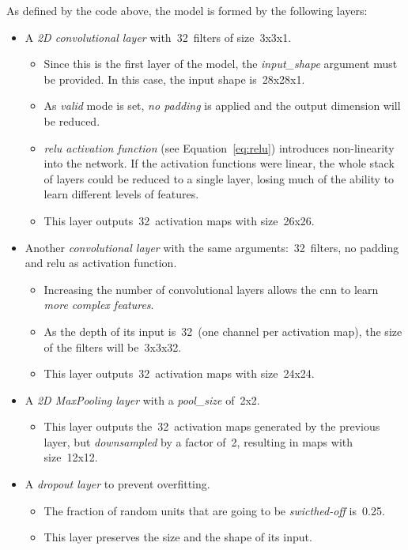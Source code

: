 As defined by the code above, the model is formed by the following layers:
\begin{itemize}
	\item A \emph{2D convolutional layer} with~32~filters of size~3x3x1.
	\begin{itemize}
		\item Since this is the first layer of the model, the \emph{\textit{input\_shape}} argument must be provided. In this case, the input shape is~28x28x1. 
		\item As \textit{valid} mode is set, \emph{no padding} is applied and the output dimension will be reduced. 
		\item \emph{\gls{relu} activation function} (see Equation~\ref{eq:relu}) introduces non-linearity into the network. If the activation functions were linear, the whole stack of layers could be reduced to a single layer, losing much of the ability to learn different levels of features.
		\item This layer outputs~32~activation maps with size~26x26.
	\end{itemize}
	
	\item Another \emph{convolutional layer} with the same arguments:~32~filters, no padding and \gls{relu} as activation function.
	\begin{itemize}
		\item Increasing the number of convolutional layers allows the \gls{cnn} to learn \emph{more complex features}. 
		\item As the depth of its input is~32~(one channel per activation map), the size of the filters will be~3x3x32. 
		\item This layer outputs~32~activation maps with size~24x24.
	\end{itemize}
	
	\item A \emph{2D MaxPooling layer} with a \textit{pool\_size} of~2x2.
	\begin{itemize}
		\item This layer outputs the~32~activation maps generated by the previous layer, but \emph{\textit{downsampled}} by a factor of~2, resulting in maps with size~12x12.
	\end{itemize}
	
	\item A \emph{dropout layer} to prevent overfitting. 
	\begin{itemize}
		\item The fraction of random units that are going to be \emph{\textit{swicthed-off}} is~0.25.
		\item This layer preserves the size and the shape of its input.
	\end{itemize} 
	

\end{itemize}
